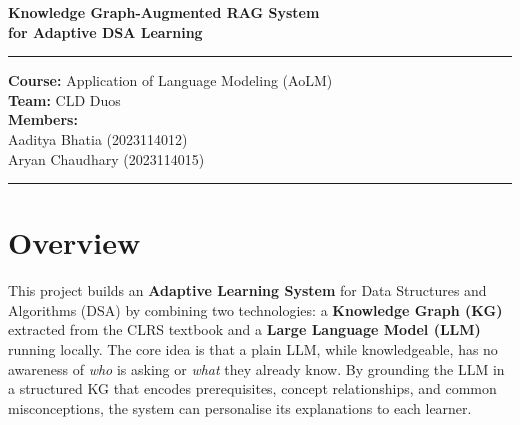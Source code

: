 \documentclass[12pt,a4paper]{article}
\begin{document}

\begin{titlepage}
  \thispagestyle{empty}
  \centering
  \vspace*{3cm}

  {\Huge\bfseries\color{darkblue}
    Knowledge Graph-Augmented RAG System\\[6pt]
    for Adaptive DSA Learning
  \par}

  \vspace{1.5cm}
  \rule{0.6\textwidth}{1pt}
  \vspace{1.2cm}

  {\large
    \textbf{Course:} Application of Language Modeling (AoLM)\\[8pt]
    \textbf{Team:} CLD Duos\\[8pt]
    \textbf{Members:}\\[6pt]
    Aaditya Bhatia \quad (2023114012)\\[4pt]
    Aryan Chaudhary \quad (2023114015)
  \par}

  \vspace{1.2cm}
  \rule{0.6\textwidth}{1pt}

  \vfill
\end{titlepage}

\thispagestyle{empty}
\tableofcontents
\clearpage

\section{Overview}

This project builds an \textbf{Adaptive Learning System} for Data Structures
and Algorithms (DSA) by combining two technologies: a \textbf{Knowledge Graph
(KG)} extracted from the CLRS textbook and a \textbf{Large Language Model
(LLM)} running locally. The core idea is that a plain LLM, while knowledgeable,
has no awareness of \textit{who} is asking or \textit{what} they already know.
By grounding the LLM in a structured KG that encodes prerequisites, concept
relationships, and common misconceptions, the system can personalise its
explanations to each learner.
\end{document}
